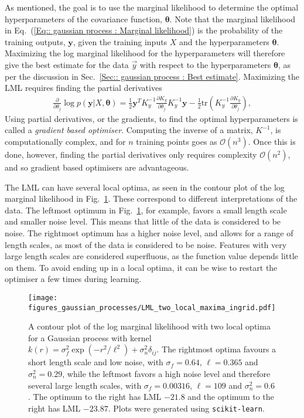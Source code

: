\documentclass[twoside,english]{uiofysmaster}
\begin{document}
{{As mentioned, the goal is to use the marginal likelihood to determine the optimal hyperparameters of the covariance function, $\boldsymbol{\theta}$. Note that the marginal likelihood in Eq.~(\ref{Eq:: gaussian process : Marginal likelihood}) is the probability of the training outputs, $\textbf{y}$, given the training inputs $X$ and the hyperparameters $\boldsymbol{\theta}$. Maximizing the log marginal likelihood for the hyperparameters will therefore give the best estimate for the data $\vec{y}$ with respect to the hyperparameters $\boldsymbol{\theta}$, as per the discussion in Sec.~\ref{Sec:: gaussian process : Best estimate}. Maximizing the LML requires finding the partial derivatives 
\begin{align}
\frac{\partial}{\partial \theta_j}
 \log p(\textbf{y}|X, \boldsymbol{\theta}) = \frac{1}{2} \textbf{y}^T K_y^{-1} \frac{\partial K_y}{\partial \theta_j} K_y^{-1} \textbf{y} - \frac{1}{2} \text{tr} (K_y^{-1} \frac{\partial K_y}{\partial \theta_j}),
\end{align}
Using partial derivatives, or the gradients, to find the optimal hyperparameters is called a \textit{gradient based optimiser}. Computing the inverse of a matrix, $K^{-1}$, is computationally complex, and for $n$ training points goes as $\mathcal{O}(n^3)$. Once this is done, however, finding the partial derivatives only requires complexity $\mathcal{O}(n^2)$, and so gradient based optimisers are advantageous.

The LML can have several local optima, as seen in the contour plot of the log marginal likelihood in Fig.~\ref{Fig:: gaussian process : LML several local optima}. These correspond to different interpretations of the data. The leftmost optimum in Fig.~\ref{Fig:: gaussian process : LML several local optima}, for example, favors a small length scale and smaller noise level. This means that little of the data is considered to be noise. The rightmost optimum has a higher noise level, and allows for a range of length scales, as most of the data is considered to be noise. Features with very large length scales are considered superfluous, as the function value depends little on them. To avoid ending up in a local optima, it can be wise to restart the optimiser a few times during learning.

\begin{figure}
\centering
\texttt{[image: figures\_gaussian\_processes/LML\_two\_local\_maxima\_ingrid.pdf]}
\caption{A contour plot of the log marginal likelihood with two local optima for a Gaussian process with kernel $k(r) = \sigma_f^2 \exp(- r^2 / \ell^2) + \sigma_n^2 \delta_{ij}$. The rightmost optima favours a short length scale and low noise, with $\sigma_f = 0.64$, $\ell = 0.365$ and $\sigma^2_n = 0.29$, while the leftmost favors a high noise level and therefore several large length scales, with $\sigma_f = 0.00316$, $\ell = 109$ and $\sigma^2_n = 0.6$. The optimum to the right has LML $-21.8$ and the optimum to the right has LML $-23.87$. Plots were generated using {\tt scikit-learn}.}
\label{Fig:: gaussian process : LML several local optima}
\end{figure}


}}
\end{document}
